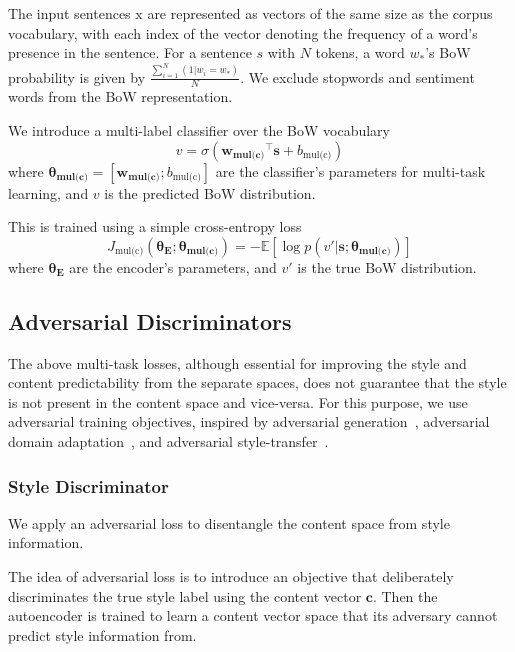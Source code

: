 \documentclass[letterpaper]{article} %
\newcommand{\rmx}{\mathrm x}
\newcommand{\loss}[1]{J_{\text{#1}}}
\newcommand{\nnweight}[1]{\bm{\theta_{\text{#1}}}}
\newcommand{\weight}[1]{\bm{w_{\text{#1}}}}
\newcommand{\bias}[1]{b_{\text{#1}}}
\begin{document}
The input sentences $\rmx$ are represented as vectors of the same size as the corpus vocabulary, with each index of the vector denoting the frequency of a word's presence in the sentence.
For a sentence $s$ with $N$ tokens, a word $w_*$'s BoW probability is given by $\frac{\sum_{i=1}^{N}{(1 | w_i = w_*)}}{N}$.
We exclude stopwords and sentiment words \cite{hu2004mining} from the BoW representation.

We introduce a multi-label classifier over the BoW vocabulary
\begin{equation} \label{eqn:bow-pred}
	v = \sigma({\weight{mul(c)}}^\top \bm s + \bias{mul(c)})
\end{equation}
where $\nnweight{mul(c)}=[\weight{mul(c)}; \bias{mul(c)}]$ are the classifier's parameters for multi-task learning, and $v$ is the predicted BoW distribution.

This is trained using a simple cross-entropy loss
\begin{equation} \label{eqn:content-multi-task-loss}
	\loss{mul(c)}(\nnweight{E};\nnweight{mul(c)}) =
	- \mathbb{E} [\log p(v' | \bm s; \nnweight{mul(c)})]
\end{equation}
where $\nnweight{E}$ are the encoder's parameters, and $v'$ is the true BoW distribution.


\subsection{Adversarial Discriminators}

The above multi-task losses, although essential for improving the style and content predictability from the separate spaces, does not guarantee that the style is not present in the content space and vice-versa. For this purpose, we use adversarial training objectives, inspired by adversarial generation~\cite{goodfellow2014generative}, adversarial domain adaptation~\cite{liu2017adversarial}, and adversarial style-transfer~\cite{shen2017style,fu2017style}.

\subsubsection{Style Discriminator} \label{ssec:adversarial-style-objective}

We apply an adversarial loss to disentangle the content space from style information.

The idea of adversarial loss is to introduce an objective that deliberately discriminates the true style label using the content vector $\bm c$.
Then the autoencoder is trained to learn a content vector space that its adversary cannot predict style information from.
\end{document}
